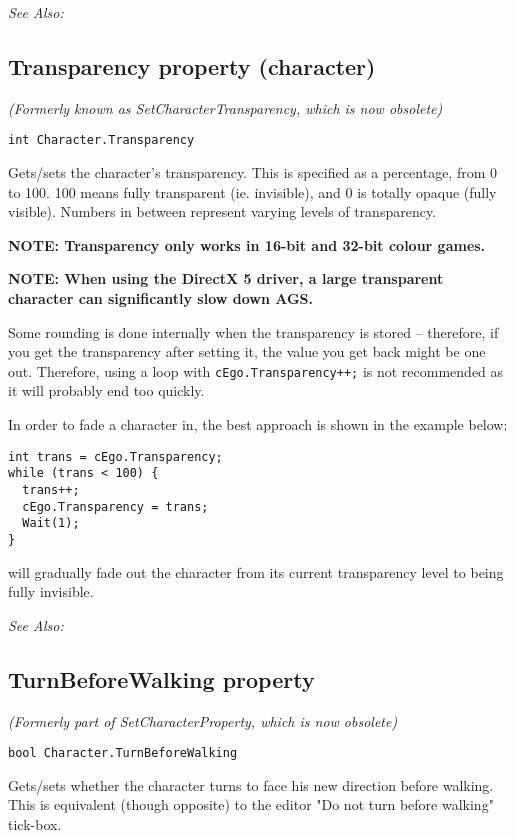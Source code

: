\it{See Also:} 


\subsection{Transparency property (character)}\label{Character.Transparency}%

\it{(Formerly known as SetCharacterTransparency, which is now obsolete)}

\begin{verbatim}
int Character.Transparency
\end{verbatim}
Gets/sets the character's transparency. This is specified as a percentage, from 0 to 100.
100 means fully transparent (ie. invisible), and 0 is totally opaque (fully visible). Numbers
in between represent varying levels of transparency.

\bf{NOTE:} Transparency only works in 16-bit and 32-bit colour games.

\bf{NOTE:} When using the DirectX 5 driver, a large transparent character can significantly slow
down AGS.

Some rounding is done internally when the transparency is stored -- therefore, if you get
the transparency after setting it, the value you get back might be one out. Therefore, using
a loop with \verb$cEgo.Transparency++;$ is not recommended as it will probably
end too quickly.

In order to fade a character in, the best approach is shown in the example below:

\begin{verbatim}
int trans = cEgo.Transparency;
while (trans < 100) {
  trans++;
  cEgo.Transparency = trans;
  Wait(1);
}
\end{verbatim}
will gradually fade out the character from its current transparency level to being fully
invisible.

\it{See Also:} 


\subsection{TurnBeforeWalking property}\label{Character.TurnBeforeWalking}%

\it{(Formerly part of SetCharacterProperty, which is now obsolete)}

\begin{verbatim}
bool Character.TurnBeforeWalking
\end{verbatim}
Gets/sets whether the character turns to face his new direction before walking. This
is equivalent (though opposite) to the editor "Do not turn before walking" tick-box.


